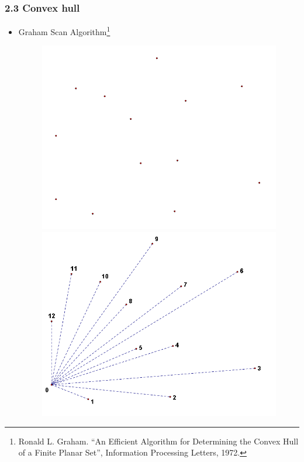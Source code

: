 \documentclass[notheorems,serif,table,compress]{beamer}  %
\begin{document}
\begin{frame}
\frametitle{2.3 Convex hull}
    \begin{itemize}
        \item Graham Scan Algorithm\footnote{Ronald L. Graham. ``An Efficient Algorithm for Determining the Convex Hull of a Finite Planar Set'', Information Processing Letters, 1972.}
            \begin{figure}
              \centering
              \begin{minipage}[t]{0.35\linewidth}
              \includegraphics[width=1\linewidth]{gra1}
              \end{minipage}
              \pause
              \begin{minipage}[t]{0.35\linewidth}
              \includegraphics[width=1\linewidth]{gra2}

\end{minipage}
\end{figure}
\end{itemize}
\end{frame}
\end{document}
